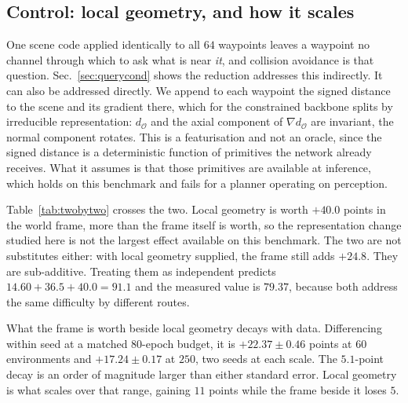 \documentclass[10pt,twocolumn,letterpaper]{article}
\begin{document}
\subsection{Control: local geometry, and how it scales}
\label{sec:localgeom}
One scene code applied identically to all $64$ waypoints leaves a waypoint no
channel through which to ask what is near \emph{it}, and collision avoidance is
that question. Sec.~\ref{sec:querycond} shows the reduction addresses this
indirectly. It can also be addressed directly. We append to each waypoint the
signed distance to the scene and its gradient there, which for the constrained
backbone splits by irreducible representation: $d_{\mathcal{O}}$ and the axial
component of $\nabla d_{\mathcal{O}}$ are invariant, the normal component
rotates. This is a featurisation and not an oracle, since the signed distance is
a deterministic function of primitives the network already receives. What it
assumes is that those primitives are available at inference, which holds on this
benchmark and fails for a planner operating on perception.

Table~\ref{tab:twobytwo} crosses the two. Local geometry is worth $+40.0$ points
in the world frame, more than the frame itself is worth, so the representation
change studied here is not the largest effect available on this benchmark. The
two are not substitutes either: with local geometry supplied, the frame still
adds $+24.8$. They are sub-additive. Treating them as independent predicts
$14.60 + 36.5 + 40.0 = 91.1$ and the measured value is $79.37$, because both
address the same difficulty by different routes.

What the frame is worth beside local geometry decays with data. Differencing
within seed at a matched $80$-epoch budget, it is $+22.37 \pm 0.46$ points at
$60$ environments and $+17.24 \pm 0.17$ at $250$, two seeds at each scale. The
$5.1$-point decay is an order of magnitude larger than either standard error.
Local geometry is what scales over that range, gaining $11$ points while the
frame beside it loses $5$.
\end{document}
